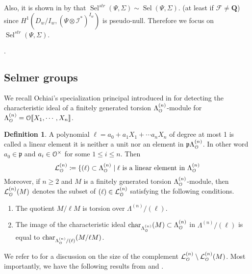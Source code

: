 \documentclass[leqno]{amsart}
\theoremstyle{definition}
\newtheorem{defn}[thm]{Definition}
\theoremstyle{remark}
\newcommand{\eo}{\EuScript{O}}
\newcommand{\Q}{{\mathbf{Q}}}
\newcommand{\fp}{\mathfrak{p}}
\newcommand{\F}{{\mathcal{F}}} %
\newcommand{\I}{\mathcal{I}} %
\DeclareMathOperator{\Sel}{Sel}
\DeclareMathOperator{\car}{char}
\newcommand{\lin}[1]{\mathcal{L}^{(#1)}}
\newcommand{\Lda}[1]{\Lambda^{(#1)}}
\begin{document}
Also, it is shown in 
by \cite[Thm 2.8]{Hsieh2010}
that 
$\Sel^{str}(\Psi, \Sigma)\sim \Sel(\Psi,\Sigma)$.
(at least if $\F\neq \Q$)
since
$H^1(D_w/I_w, (\Psi\otimes\I^*)^{I_w})$
is pseudo-null.
Therefore we focus on 
$\Sel^{str}(\Psi,\Sigma)$.




\cite[Lem 5.8]{Schneider2016}.

\subsection{Selmer groups}

We recall Ochiai's specialization principal 
introduced in \cite{Och05}
for detecting the characteristic ideal 
of a finitely generated torsion
$\Lda{n}_{\eo}$-module for
$\Lda{n}_{\eo}=\eo\llbracket X_1,\cdots, X_n\rrbracket$.

\begin{defn}\label{def:lin_elt}
A polynomial 
$\ell=a_0+a_1X_1+\cdots a_nX_n$
of degree at most 1
is called a linear element 
it is neither a unit
nor an element in $\fp\Lda{n}_{\eo}$.
In other word $a_0\in\fp$
and $a_i\in\eo^\times$
for some $1\leq i\leq n$.
Then 
\[
    \lin{n}_{\eo}\coloneqq\{(\ell)\subset \Lda{n}_{\eo}\mid\ell
    \text{ is a linear element in }\Lda{n}_{\eo}
\]
Moreover, if $n\geq 2$
and $M$ is a finitely generated torsion 
$\Lda{n}_{\eo}$-module, then 
$\lin{n}_{\eo}(M)$ denotes the subset of
$(\ell)\in \lin{n}_{\eo}$ satisfying the following conditions.
\begin{enumerate}
    \item The quotient $M/\ell M$ is 
    torsion over $\Lambda^{(n)}/(\ell)$.
    \item The image of the characteristic ideal
    $\car_{\Lda{n}_{\eo}}(M)\subset \Lda{n}_{\eo}$ in $\Lambda^{(n)}/(\ell)$
    is equal to $\car_{\Lda{n}_{\eo}/(\ell)}(M/\ell M)$.
\end{enumerate}
\end{defn}

We refer to \cite[Lem 3.5]{Och05}
for a discussion on the size of the complement
$\lin{n}_{\eo}\setminus \lin{n}_{\eo}(M)$.
Most importantly,
we have the following results
from \cite[Prop 3.6]{Och05}
and \cite[Prop 3.11]{Och05}.
\end{document}
